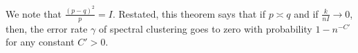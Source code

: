 \documentclass{article}
\begin{document}
We note that $\frac{(p-q)^2}{p} = I$. Restated, this theorem says that if $p \asymp q$ and if $ \frac{k}{nI} \rightarrow 0$, then, the error rate $\gamma$ of spectral clustering goes to zero with probability $1 - n^{-C'}$ for any constant $C' > 0$. 






\end{document}

